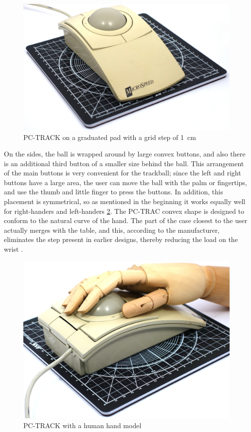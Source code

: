 \documentclass[11pt, a4paper]{article}
\begin{document}
\begin{figure}[h]
    \centering
    \includegraphics[scale=0.3]{1991_microspeed_pc-track/size_60.jpg}
    \caption{PC-TRACK on a graduated pad with a grid step of 1~cm}
    \label{fig:PCTRACKSize}
\end{figure}

On the sides, the ball is wrapped around by large convex buttons, and also there is an additional third button of a smaller size behind the ball. This arrangement of the main buttons is very convenient for the trackball; since the left and right buttons have a large area, the user can move the ball with the palm or fingertips, and use the thumb and little finger to press the buttons. In addition, this placement is symmetrical, so as mentioned in the beginning it works equally well for right-handers and left-handers \ref{fig:PCTRACKHand}. The PC-TRAC convex shape is designed to conform to the natural curve of the hand. The part of the case closest to the user actually merges with the table, and this, according to the manufacturer, eliminates the step present in earlier designs, thereby reducing the load on the wrist \cite{PC}.

\begin{figure}[h]
    \centering
    \includegraphics[scale=0.3]{1991_microspeed_pc-track/hand_60.jpg}
    \caption{PC-TRACK with a human hand model}
    \label{fig:PCTRACKHand}
\end{figure}
\end{document}
